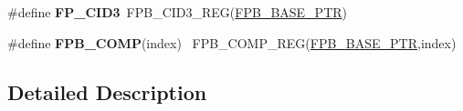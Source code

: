 \begin{DoxyCompactItemize}
\item 
\hypertarget{group___f_p_b___register___accessor___macros_gacb056c6cfc1741d7d65a4ceb25b0c9ff}{}\#define {\bfseries F\+P\+\_\+\+C\+I\+D3}~F\+P\+B\+\_\+\+C\+I\+D3\+\_\+\+R\+E\+G(\hyperlink{group___f_p_b___peripheral_ga95d994c97f967ce02339465def6bac95}{F\+P\+B\+\_\+\+B\+A\+S\+E\+\_\+\+P\+T\+R})\label{group___f_p_b___register___accessor___macros_gacb056c6cfc1741d7d65a4ceb25b0c9ff}

\item 
\hypertarget{group___f_p_b___register___accessor___macros_ga790522742b01d47ba97e4977225c8067}{}\#define {\bfseries F\+P\+B\+\_\+\+C\+O\+M\+P}(index)                                                ~F\+P\+B\+\_\+\+C\+O\+M\+P\+\_\+\+R\+E\+G(\hyperlink{group___f_p_b___peripheral_ga95d994c97f967ce02339465def6bac95}{F\+P\+B\+\_\+\+B\+A\+S\+E\+\_\+\+P\+T\+R},index)\label{group___f_p_b___register___accessor___macros_ga790522742b01d47ba97e4977225c8067}

\end{DoxyCompactItemize}


\subsection{Detailed Description}

